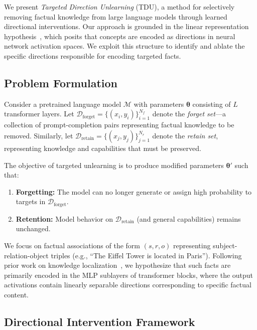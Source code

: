 \label{sec:method}

We present \emph{Targeted Direction Unlearning} (TDU), a method for selectively removing factual knowledge from large language models through learned directional interventions. Our approach is grounded in the linear representation hypothesis~\citep{park2023linear,nanda2023emergent}, which posits that concepts are encoded as directions in neural network activation spaces. We exploit this structure to identify and ablate the specific directions responsible for encoding targeted facts.

\subsection{Problem Formulation}
\label{sec:problem}

Consider a pretrained language model $\mathcal{M}$ with parameters $\bm{\theta}$ consisting of $L$ transformer layers. Let $\mathcal{D}_{\text{forget}} = \{(x_i, y_i)\}_{i=1}^{N_f}$ denote the \emph{forget set}---a collection of prompt-completion pairs representing factual knowledge to be removed. Similarly, let $\mathcal{D}_{\text{retain}} = \{(x_j, y_j)\}_{j=1}^{N_r}$ denote the \emph{retain set}, representing knowledge and capabilities that must be preserved.

The objective of targeted unlearning is to produce modified parameters $\bm{\theta}'$ such that:
\begin{enumerate}
    \item \textbf{Forgetting:} The model can no longer generate or assign high probability to targets in $\mathcal{D}_{\text{forget}}$.
    \item \textbf{Retention:} Model behavior on $\mathcal{D}_{\text{retain}}$ (and general capabilities) remains unchanged.
\end{enumerate}

We focus on factual associations of the form $(s, r, o)$ representing subject-relation-object triples (e.g., ``The Eiffel Tower is located in Paris''). Following prior work on knowledge localization~\citep{meng2022locating,geva2023dissecting}, we hypothesize that such facts are primarily encoded in the MLP sublayers of transformer blocks, where the output activations contain linearly separable directions corresponding to specific factual content.

\subsection{Directional Intervention Framework}
\label{sec:direction}

